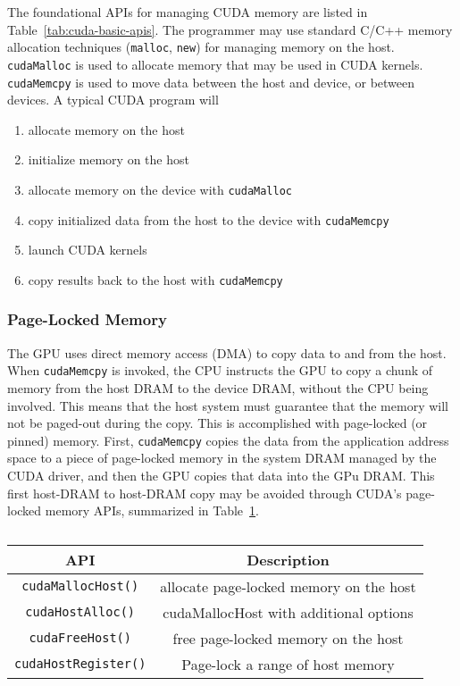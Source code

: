 The foundational APIs for managing CUDA memory are listed in Table~\ref{tab:cuda-basic-apis}.
The programmer may use standard C/C++ memory allocation techniques (\texttt{malloc}, \texttt{new}) for managing memory on the host.
\texttt{cudaMalloc} is used to allocate memory that may be used in CUDA kernels.
\texttt{cudaMemcpy} is used to move data between the host and device, or between devices.
A typical CUDA program will
\begin{enumerate}
    \item allocate memory on the host
    \item initialize memory on the host
    \item allocate memory on the device with \texttt{cudaMalloc}
    \item copy initialized data from the host to the device with \texttt{cudaMemcpy}
    \item launch CUDA kernels
    \item copy results back to the host with \texttt{cudaMemcpy}
\end{enumerate}


\subsubsection{Page-Locked Memory}

The GPU uses direct memory access (DMA) to copy data to and from the host.
When \texttt{cudaMemcpy} is invoked, the CPU instructs the GPU to copy a chunk of memory from the host DRAM to the device DRAM, without the CPU being involved.
This means that the host system must guarantee that the memory will not be paged-out during the copy.
This is accomplished with page-locked (or pinned) memory.
First, \texttt{cudaMemcpy} copies the data from the application address space to a piece of page-locked memory in the system DRAM managed by the CUDA driver, and then the GPU copies that data into the GPu DRAM.
This first host-DRAM to host-DRAM copy may be avoided through CUDA's page-locked memory APIs, summarized in Table~\ref{tab:cuda-pinned-apis}.

\begin{table}[h]
    \centering
    \caption[CUDA Pinned Memory-Management APIs]{}
    \label{tab:cuda-pinned-apis}
    \begin{tabular}{|c|c|}
    \hline
    \textbf{API}                & \textbf{Description} \\ \hline
    \texttt{cudaMallocHost()}   & allocate page-locked memory on the host\\ \hline
    \texttt{cudaHostAlloc()}    & cudaMallocHost with additional options \\ \hline
    \texttt{cudaFreeHost()}     & free page-locked memory on the host\\ \hline
    \texttt{cudaHostRegister()} & Page-lock a range of host memory \\ \hline
    \end{tabular}
\end{table}

